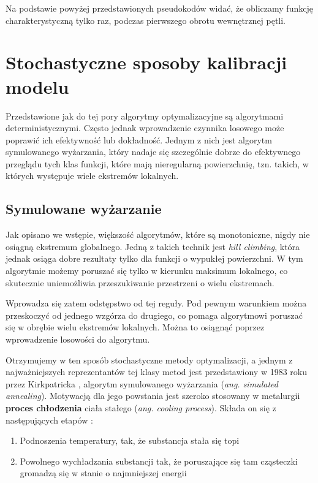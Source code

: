 \documentclass{pracamgr}
\begin{document}
Na podstawie powyżej przedstawionych pseudokodów widać, że obliczamy funkcję 
charakterystyczną tylko raz, podczas pierwszego obrotu wewnętrznej pętli.



\section{Stochastyczne sposoby kalibracji modelu}
Przedstawione jak do tej pory algorytmy optymalizacyjne są algorytmami deterministycznymi.
Często jednak wprowadzenie czynnika losowego może poprawić ich efektywność lub dokładność. Jednym z
nich jest algorytm symulowanego wyżarzania, który nadaje się szczególnie dobrze do efektywnego
przeglądu tych klas funkcji, które mają nieregularną powierzchnię, tzn. takich, w których występuje
wiele ekstremów lokalnych.

\subsection{Symulowane wyżarzanie}

Jak opisano we wstępie, większość algorytmów, które są monotoniczne, nigdy nie osiągną ekstremum
globalnego. Jedną z takich technik jest \textit{hill climbing}, która jednak 
osiąga dobre rezultaty tylko dla funkcji o wypukłej powierzchni. W tym algorytmie możemy poruszać się
tylko w kierunku maksimum lokalnego, co skutecznie uniemożliwia przeszukiwanie przestrzeni o wielu
ekstremach.

Wprowadza się zatem odstępstwo od tej reguły. Pod pewnym warunkiem można przeskoczyć od 
jednego wzgórza do drugiego, co pomaga algorytmowi poruszać się w obrębie wielu ekstremów lokalnych.
Można to osiągnąć poprzez wprowadzenie losowości do algorytmu. 

Otrzymujemy w ten sposób stochastyczne metody optymalizacji, a jednym z najważniejszych 
reprezentantów tej klasy metod jest przedstawiony w 1983 roku przez Kirkpatricka 
\cite{Kirkpatrick},  algorytm symulowanego wyżarzania  (\textit{ang. simulated annealing}). 
Motywacją dla jego powstania jest szeroko stosowany w metalurgii \textbf{proces chłodzenia}
 ciała stałego (\textit{ang. cooling process}). Składa on się z
następujących etapów  \cite{ChenBin}:

\begin{enumerate}
  \item Podnoszenia temperatury, tak, że substancja stała się topi
  \item Powolnego wychładzania substancji tak, że poruszające się tam cząsteczki gromadzą się w stanie o najmniejszej energii
\end{enumerate}
\end{document}

